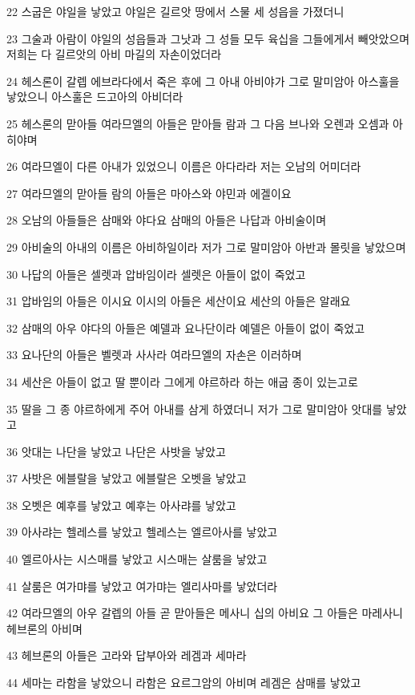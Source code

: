 \par 22 스굽은 야일을 낳았고 야일은 길르앗 땅에서 스물 세 성읍을 가졌더니
\par 23 그술과 아람이 야일의 성읍들과 그낫과 그 성들 모두 육십을 그들에게서 빼앗았으며 저희는 다 길르앗의 아비 마길의 자손이었더라
\par 24 헤스론이 갈렙 에브라다에서 죽은 후에 그 아내 아비야가 그로 말미암아 아스훌을 낳았으니 아스훌은 드고아의 아비더라
\par 25 헤스론의 맏아들 여라므엘의 아들은 맏아들 람과 그 다음 브나와 오렌과 오셈과 아히야며
\par 26 여라므엘이 다른 아내가 있었으니 이름은 아다라라 저는 오남의 어미더라
\par 27 여라므엘의 맏아들 람의 아들은 마아스와 야민과 에겔이요
\par 28 오남의 아들들은 삼매와 야다요 삼매의 아들은 나답과 아비술이며
\par 29 아비술의 아내의 이름은 아비하일이라 저가 그로 말미암아 아반과 몰릿을 낳았으며
\par 30 나답의 아들은 셀렛과 압바임이라 셀렛은 아들이 없이 죽었고
\par 31 압바임의 아들은 이시요 이시의 아들은 세산이요 세산의 아들은 알래요
\par 32 삼매의 아우 야다의 아들은 예델과 요나단이라 예델은 아들이 없이 죽었고
\par 33 요나단의 아들은 벨렛과 사사라 여라므엘의 자손은 이러하며
\par 34 세산은 아들이 없고 딸 뿐이라 그에게 야르하라 하는 애굽 종이 있는고로
\par 35 딸을 그 종 야르하에게 주어 아내를 삼게 하였더니 저가 그로 말미암아 앗대를 낳았고
\par 36 앗대는 나단을 낳았고 나단은 사밧을 낳았고
\par 37 사밧은 에블랄을 낳았고 에블랄은 오벳을 낳았고
\par 38 오벳은 예후를 낳았고 예후는 아사랴를 낳았고
\par 39 아사랴는 헬레스를 낳았고 헬레스는 엘르아사를 낳았고
\par 40 엘르아사는 시스매를 낳았고 시스매는 살룸을 낳았고
\par 41 살룸은 여가먀를 낳았고 여가먀는 엘리사마를 낳았더라
\par 42 여라므엘의 아우 갈렙의 아들 곧 맏아들은 메사니 십의 아비요 그 아들은 마레사니 헤브론의 아비며
\par 43 헤브론의 아들은 고라와 답부아와 레겜과 세마라
\par 44 세마는 라함을 낳았으니 라함은 요르그암의 아비며 레겜은 삼매를 낳았고
